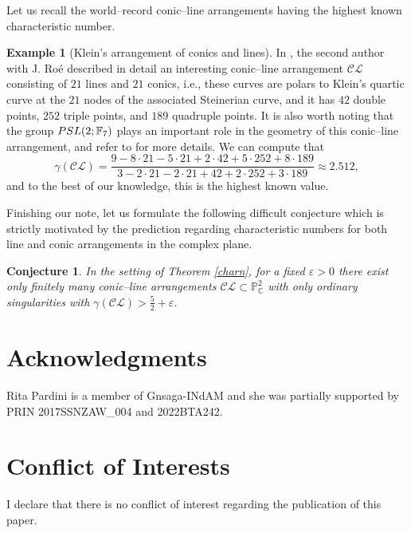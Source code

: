 \documentclass[12pt]{amsart}
\theoremstyle{plain}
\newtheorem{conjecture}[thm]{Conjecture}
\theoremstyle{definition}
\newtheorem{example}[thm]{Example}
\begin{document}
Let us recall the world--record conic--line arrangements having the highest known characteristic number.
\begin{example}[Klein's arrangement of conics and lines]
In \cite{PR2019}, the second author with J. Ro\'e described in detail an interesting conic--line arrangement $\mathcal{CL}$ consisting of $21$ lines and $21$ conics, i.e., these curves are polars to Klein's quartic curve at the $21$ nodes of the associated Steinerian curve, and it has $42$ double points, $252$ triple points, and $189$ quadruple points. It is also worth noting that the group ${\rm PSL}(2;\mathbb{F}_{7})$ plays an important role in the geometry of this conic--line arrangement, and refer to \cite[Section 3]{PR2019} for more details. We can compute that
$$\gamma(\mathcal{CL}) = \frac{9 - 8\cdot 21 - 5\cdot 21 + 2\cdot 42 + 5\cdot 252 + 8\cdot 189}{3-2\cdot 21 - 2\cdot 21 + 42 + 2\cdot 252 + 3\cdot 189} \approx 2.512,$$  and to the best of our knowledge, this is the highest known value.
\end{example}
Finishing our note, let us formulate the following difficult conjecture which is strictly motivated by the prediction regarding characteristic numbers for both line and conic arrangements in the complex plane.
\begin{conjecture}
In the setting of Theorem \ref{charn}, for a fixed $\varepsilon >0$ there exist only finitely many conic--line arrangements $\mathcal{CL} \subset \mathbb{P}^{2}_{\mathbb{C}}$ with only ordinary singularities with $\gamma(\mathcal{CL}) > \frac{5}{2} + \varepsilon$.
\end{conjecture}
\section*{Acknowledgments}
 \noindent Rita Pardini is a member of Gnsaga-INdAM and she was partially supported by PRIN 2017SSNZAW\_004 and 2022BTA242. 
\section*{Conflict of Interests}
I declare that there is no conflict of interest regarding the publication of this paper.
\end{document}
